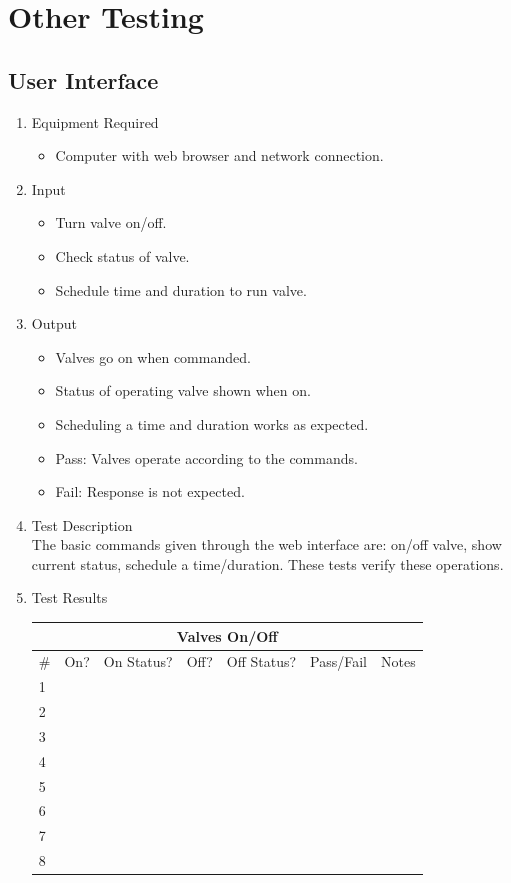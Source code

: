 \documentclass{article}
\begin{document}
\section{Other Testing}

\subsection{User Interface}

\begin{enumerate}
\item Equipment Required
	\begin{itemize}
	\item Computer with web browser and network connection.
	\end{itemize}
\item Input
	\begin{itemize}
	\item Turn valve on/off.
	\item Check status of valve.
	\item Schedule time and duration to run valve.
	\end{itemize}
\item Output
	\begin{itemize}
	\item Valves go on when commanded.
	\item Status of operating valve shown when on.
	\item Scheduling a time and duration works as expected.
	\item Pass: Valves operate according to the commands.
	\item Fail: Response is not expected.
	\end{itemize}
\item Test Description \\

The basic commands given through the web interface are:
on/off valve, show current status, schedule a time/duration.
These tests verify these operations.

\item Test Results \\
	\vspace{0.25in}
	\begin{tabular}{|l|l|l|l|l|l|c|}
		\hline
		\multicolumn{7}{|c|}{Valves On/Off} \\
		\hline
		\# & On? & On Status? & Off? & Off Status? & Pass/Fail & \hspace{0.7in}Notes\hspace{0.7in} \\
		\hline
		1 &&&&&& \\
		\hline
		2 &&&&&& \\
		\hline
		3 &&&&&& \\
		\hline
		4 &&&&&& \\
		\hline
		5 &&&&&& \\
		\hline
		6 &&&&&& \\
		\hline
		7 &&&&&& \\
		\hline
		8 &&&&&& \\
		\hline
	\end{tabular}


\end{enumerate}
\end{document}
